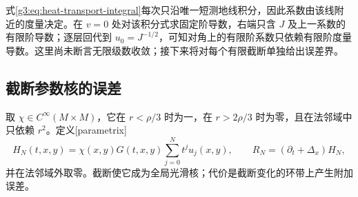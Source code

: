 式\eqref{g3:eq:heat-transport-integral}每次只沿唯一短测地线积分，因此系数由该线附近的度量决定。在 \(v=0\) 处对该积分式求固定阶导数，右端只含 \(J\) 及上一系数的有限阶导数；逐层回代到 \(u_0=J^{-1/2}\)，可知对角上的有限阶系数只依赖有限阶度量导数。这里尚未断言无限级数收敛；接下来将对每个有限截断单独给出误差界。

\subsection{截断参数核的误差}
\label{g3:subsec:1602:03}
取 \(\chi\in C^\infty(M\times M)\)，它在 \(r<\rho/3\) 时为一，在 \(r>2\rho/3\) 时为零，且在法邻域中只依赖 \(r^2\)。定义[parametrix]
\begin{equation}\label{g3:eq:heat-cutoff-parametrix}
	H_N(t,x,y)=\chi(x,y)G(t,x,y)\sum_{j=0}^Nt^ju_j(x,y),
	\qquad R_N=(\partial_t+\Delta_x)H_N,
\end{equation}
并在法邻域外取零。截断使它成为全局光滑核；代价是截断变化的环带上产生附加误差。


